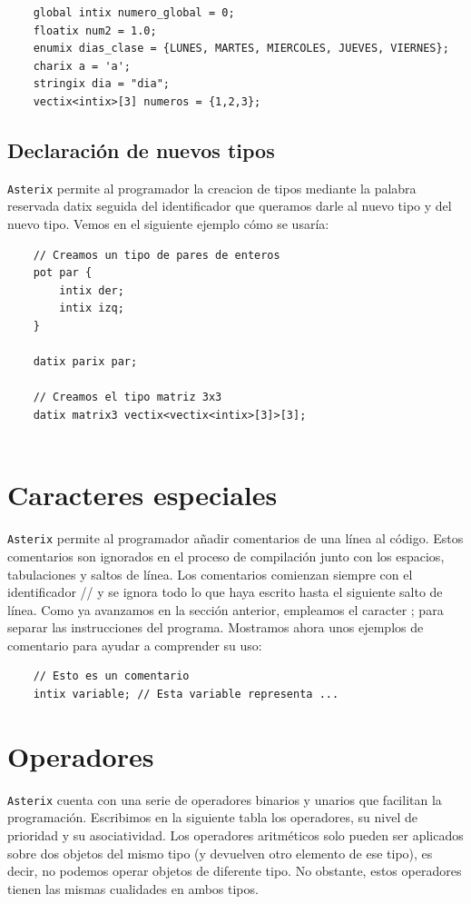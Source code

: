 \documentclass[a4paper, 10pt]{article}
\newcommand{\atx}{\texttt{Asterix} }
\begin{document}
    \begin{verbatim}
    global intix numero_global = 0;
    floatix num2 = 1.0;
    enumix dias_clase = {LUNES, MARTES, MIERCOLES, JUEVES, VIERNES};
    charix a = 'a';
    stringix dia = "dia";
    vectix<intix>[3] numeros = {1,2,3};
    \end{verbatim}

    \subsection*{Declaración de nuevos tipos}
    \atx permite al programador la creacion de tipos mediante la palabra reservada 
    \textsf{datix} seguida del identificador que queramos darle al nuevo tipo
    y del nuevo tipo. Vemos en el siguiente ejemplo cómo se usaría:

    \begin{verbatim}
    // Creamos un tipo de pares de enteros
    pot par {
        intix der;
        intix izq;
    }

    datix parix par;

    // Creamos el tipo matriz 3x3
    datix matrix3 vectix<vectix<intix>[3]>[3];
    
    \end{verbatim}


    \section*{Caracteres especiales}
    \atx permite al programador añadir comentarios de una línea al código. Estos
    comentarios son ignorados en el proceso de compilación junto con los espacios,
    tabulaciones y saltos de línea. Los comentarios comienzan siempre con el
    identificador // y se ignora todo lo que haya escrito hasta el siguiente
    salto de línea. Como ya avanzamos en la sección anterior, empleamos el
    caracter \textsc{;} para separar las instrucciones del programa. Mostramos
    ahora unos ejemplos de comentario para ayudar a comprender su uso:

    \begin{verbatim}
    // Esto es un comentario
    intix variable; // Esta variable representa ...
    \end{verbatim}

    \section*{Operadores}
    \atx cuenta con una serie de operadores binarios y unarios que facilitan
    la programación. 
    Escribimos en la siguiente tabla los operadores, su nivel de prioridad y 
    su asociatividad. Los operadores aritméticos solo pueden ser aplicados 
    sobre dos objetos del mismo tipo (y devuelven otro elemento de ese tipo),
    es decir, no podemos operar objetos de diferente tipo. No obstante, estos
    operadores tienen las mismas cualidades en ambos tipos.
\end{document}
